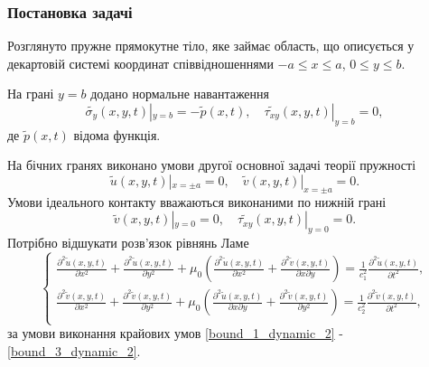 \subsubsection{Постановка задачі}
Розглянуто пружне прямокутне тіло, яке займає область,
що описується у декартовій системі координат співвідношеннями $-a \le x \le a$, $0 \le y \le b$.

На грані $y=b$ додано нормальне навантаження
\begin{equation}\label{bound_1_dynamic_2}
    \widetilde{\sigma_y}(x, y, t) |_{y=b} = -\widetilde{p}(x, t), \quad  \widetilde{\tau_{xy}}(x,y,t) |_{y=b} =0,
\end{equation}
де $\widetilde{p}(x,t)$ відома функція.

На бічних гранях виконано умови другої основної задачі теорії пружності
\begin{equation}\label{bound_2_dynamic_2}
    \widetilde{u}(x,y,t) |_{x=\pm a} = 0, \quad  \widetilde{v}(x,y,t) |_{x=\pm a} =0.
\end{equation}
Умови ідеального контакту вважаються виконаними по нижній грані
\begin{equation}\label{bound_3_dynamic_2}
    \widetilde{v}(x,y,t) |_{y=0} = 0, \quad \widetilde{\tau_{xy}}(x,y,t) |_{y=0} =0.
\end{equation}
Потрібно відшукати розв'язок рівнянь Ламе
\begin{equation}
    \begin{cases}
        \frac{\partial^2  \widetilde{u}(x,y,t)}{\partial x^2} + \frac{\partial^2  \widetilde{u}(x,y,t)}{\partial y^2} + \mu_0 (\frac{\partial^2  \widetilde{u}(x,y,t)}{\partial x^2} + \frac{\partial^2  \widetilde{v}(x,y,t)}{\partial x\partial y}) = \frac{1}{c_1^2} \frac{\partial^2  \widetilde{u}(x,y,t)}{\partial t^2}, \\
        \frac{\partial^2  \widetilde{v}(x,y,t)}{\partial x^2} + \frac{\partial^2  \widetilde{v}(x,y,t)}{\partial y^2} + \mu_0 (\frac{\partial^2  \widetilde{u}(x,y,t)}{\partial x \partial y} + \frac{\partial^2  \widetilde{v}(x,y,t)}{\partial y^2}) = \frac{1}{c_2^2} \frac{\partial^2  \widetilde{v}(x,y,t)}{\partial t^2}, \\
    \end{cases}
\end{equation}
за умови виконання крайових умов \eqref{bound_1_dynamic_2} - \eqref{bound_3_dynamic_2}.


